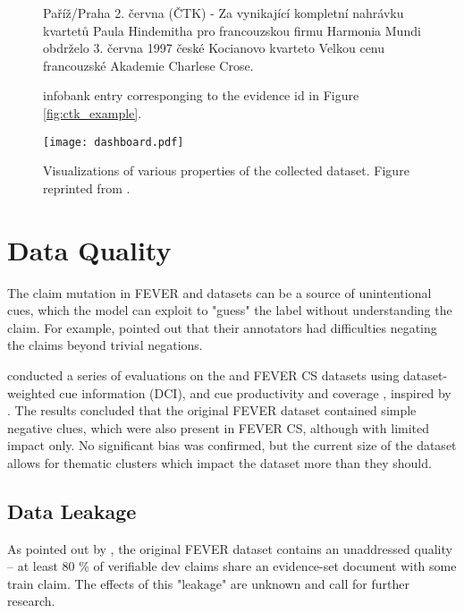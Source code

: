 \begin{figure}[h!]
    \begin{framed}
        \vspace{-1mm}
        Paříž/Praha 2. června (ČTK) - Za vynikající kompletní nahrávku kvartetů Paula Hindemitha pro francouzskou firmu Harmonia Mundi obdrželo 3. června 1997 české Kocianovo kvarteto Velkou cenu francouzské Akademie Charlese Crose.
    \end{framed}
    \caption[\CTK{} Infobank Example]{\CTK{} infobank entry corresponging to the evidence id in Figure \ref{fig:ctk_example}.}
\end{figure}

\begin{figure}[h!]
  \texttt{[image: dashboard.pdf]}
  \caption[Visualizations of Properties of the Collected Dataset]{Visualizations of various properties of the collected \CTK{} dataset. Figure reprinted from \citep{ullrich}.}
  \label{fig:dashboard}
\end{figure}

\section{Data Quality}

The claim mutation in FEVER and \CTK{} datasets can be a source of unintentional cues, which the model can exploit to "guess" the label without understanding the claim.
For example, \citet{fever} pointed out that their annotators had difficulties negating the claims beyond trivial negations.

\citet{rypar} conducted a series of evaluations on the \CTK{} and FEVER CS datasets using dataset-weighted cue information (DCI), and cue productivity and coverage \citep{niven-probing}, inspired by \citet{derczynski-etal-2020-maintaining}.
The results concluded that the original FEVER dataset contained simple negative clues, which were also present in FEVER CS, although with limited impact only. No significant bias was confirmed, but the current size of the \CTK{} dataset allows for thematic clusters which impact the dataset more than they should. 

\subsection{Data Leakage}
\label{subsec:data_leakage}

As pointed out by \citet{ullrich}, the original FEVER dataset contains an unaddressed quality -- at least 80 \% of verifiable dev claims share an evidence-set document with some train claim. The effects of this "leakage" are unknown and call for further research.

